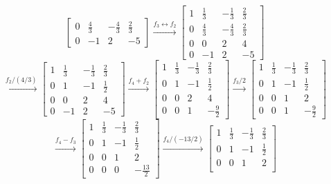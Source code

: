 \documentclass[a4paper,12pt]{article}
\begin{document}
\begin{itemize}
$$\begin{bmatrix}
        0 & \frac{4}{3} & -\frac{4}{3} & \frac{2}{3} \\
        0 & -1 & 2 & -5
    \end{bmatrix}
    \xrightarrow[]{f_3 \leftrightarrow f_2}
    \begin{bmatrix}
        1 & \frac{1}{3} & -\frac{1}{3} & \frac{2}{3} \\
        0 & \frac{4}{3} & -\frac{4}{3} & \frac{2}{3} \\
        0 & 0 & 2 & 4 \\
        0 & -1 & 2 & -5
    \end{bmatrix}
    $$
    $$
    \xrightarrow[]{f_2/(4/3)}
    \begin{bmatrix}
        1 & \frac{1}{3} & -\frac{1}{3} & \frac{2}{3} \\
        0 & 1 & -1 & \frac{1}{2} \\
        0 & 0 & 2 & 4 \\
        0 & -1 & 2 & -5
    \end{bmatrix}
    \xrightarrow[]{f_4+f_2}
    \begin{bmatrix}
        1 & \frac{1}{3} & -\frac{1}{3} & \frac{2}{3} \\
        0 & 1 & -1 & \frac{1}{2} \\
        0 & 0 & 2 & 4 \\
        0 & 0 & 1 & -\frac{9}{2}
    \end{bmatrix}
    \xrightarrow[]{f_3/2}
    \begin{bmatrix}
        1 & \frac{1}{3} & -\frac{1}{3} & \frac{2}{3} \\
        0 & 1 & -1 & \frac{1}{2} \\
        0 & 0 & 1 & 2 \\
        0 & 0 & 1 & -\frac{9}{2}
    \end{bmatrix}
    $$
    $$
    \xrightarrow[]{f_4-f_3}
    \begin{bmatrix}
        1 & \frac{1}{3} & -\frac{1}{3} & \frac{2}{3} \\
        0 & 1 & -1 & \frac{1}{2} \\
        0 & 0 & 1 & 2 \\
        0 & 0 & 0 & -\frac{13}{2}
    \end{bmatrix}
    \xrightarrow[]{f_4/(-13/2)}
    \begin{bmatrix}
        1 & \frac{1}{3} & -\frac{1}{3} & \frac{2}{3} \\
        0 & 1 & -1 & \frac{1}{2} \\
        0 & 0 & 1 & 2 \\

\end{bmatrix}$$
\end{itemize}
\end{document}

